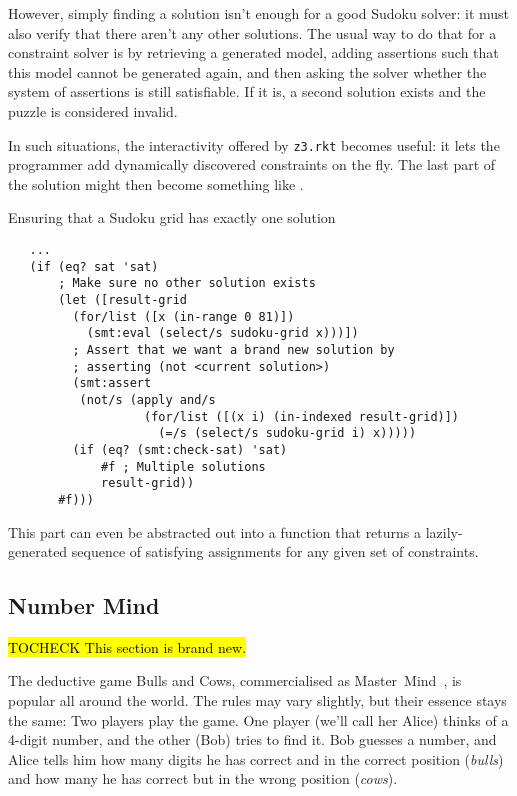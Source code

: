 However, simply finding a solution isn't enough for a good Sudoku solver: it
must also verify that there aren't any other solutions. The usual way to do
that for a constraint solver is by retrieving a generated model, adding
assertions such that this model cannot be generated again, and then asking the
solver whether the system of assertions is still satisfiable. If it is, a
second solution exists and the puzzle is considered invalid.

In such situations, the interactivity offered by \texttt{z3.rkt} becomes
useful: it lets the programmer add dynamically discovered constraints on the
fly. The last part of the solution might then become something like
.

\begin{program}
\caption{Ensuring that a Sudoku grid has exactly one solution}
\label{fig:sudoku-unique}
\begin{verbatim}
   ...
   (if (eq? sat 'sat)
       ; Make sure no other solution exists
       (let ([result-grid
         (for/list ([x (in-range 0 81)])
           (smt:eval (select/s sudoku-grid x)))])
         ; Assert that we want a brand new solution by
         ; asserting (not <current solution>)
         (smt:assert
          (not/s (apply and/s
                   (for/list ([(x i) (in-indexed result-grid)])
                     (=/s (select/s sudoku-grid i) x)))))
         (if (eq? (smt:check-sat) 'sat)
             #f ; Multiple solutions
             result-grid))
       #f)))
\end{verbatim}
\end{program}

This part can even be abstracted out into a function that returns a
lazily-generated sequence of satisfying assignments for any given set of
constraints.

\subsection{Number Mind}

\hl{TOCHECK This section is brand new.}

The deductive game Bulls and Cows, commercialised as
Master~Mind~\cite{mastermind}, is popular all around the world. The rules may
vary slightly, but their essence stays the same: Two players play the game.
One player (we'll call her Alice) thinks of a 4-digit number, and the other
(Bob) tries to find it. Bob guesses a number, and Alice tells him how many
digits he has correct and in the correct position (\textit{bulls}) and how
many he has correct but in the wrong position (\textit{cows}).

